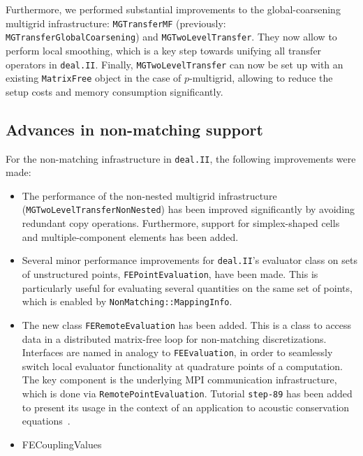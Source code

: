 \documentclass{ansarticle-preprint}
\newcommand{\specialword}[1]{\texttt{#1}}
\newcommand{\dealii}{{\specialword{deal.II}}\xspace}
\begin{document}
Furthermore, we performed substantial improvements to the global-coarsening
multigrid infrastructure: \texttt{MGTransferMF} (previously:
\texttt{MGTransferGlobalCoarsening}) and \texttt{MGTwoLevelTransfer}. They
now allow to perform local smoothing, which is a key step towards unifying
all transfer operators in \dealii. Finally, \texttt{MGTwoLevelTransfer} can now
be set up with an existing \texttt{MatrixFree} object in the case
of $p$-multigrid, allowing to reduce the setup costs and memory consumption significantly.


\subsection{Advances in non-matching support}\label{sec:nonmatching}

  
For the non-matching infrastructure in \dealii, the following improvements were made:

\begin{itemize}
\item The performance of the non-nested multigrid infrastructure
(\texttt{MGTwoLevelTransferNon\-Nested}) has been improved significantly by avoiding
redundant copy operations. Furthermore, support for simplex-shaped cells and
multiple-component elements has been added.
\item Several minor performance improvements for \dealii's evaluator class on
  sets of unstructured points, \texttt{FEPointEvaluation}, have been
  made. This is particularly useful for evaluating several quantities on the
  same set of points, which is enabled by \texttt{NonMatching::MappingInfo}.
\item The new class \texttt{FERemoteEvaluation} has been added. 
This is a class to access data
in a distributed matrix-free loop for non-matching discretizations.
Interfaces are named in analogy to \texttt{FEEvaluation}, in order to seamlessly switch
local evaluator functionality at quadrature points of a computation. The key component is the
underlying MPI communication infrastructure, which is done via \texttt{RemotePointEvaluation}.
Tutorial \texttt{step-89} has been added to present its usage
in the context of an application to acoustic conservation equations~\cite{heinz2023high}.
\item FECouplingValues

\end{itemize}
\end{document}
